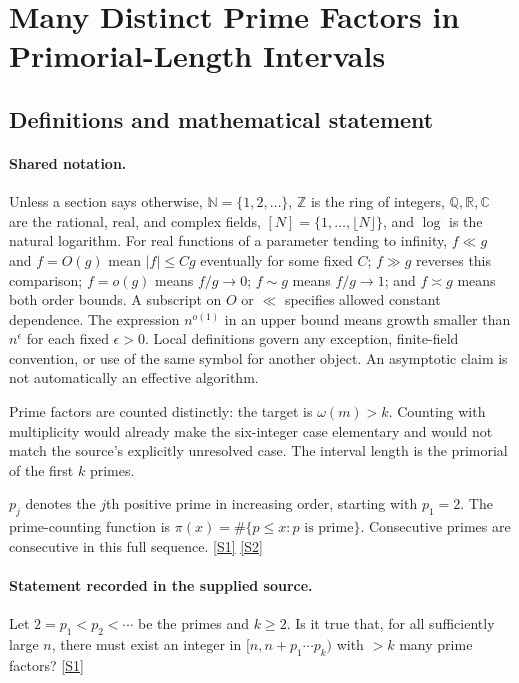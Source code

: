\documentclass[11pt,a4paper]{article}
\newcommand{\N}{\mathbb{N}}
\newcommand{\Z}{\mathbb{Z}}
\newcommand{\Q}{\mathbb{Q}}
\newcommand{\R}{\mathbb{R}}
\newcommand{\C}{\mathbb{C}}
\newcommand{\sref}[2]{\hyperlink{source:#1:#2}{[S#2]}}
\begin{document}
\section{Many Distinct Prime Factors in Primorial-Length Intervals}\label{statement}


\subsection{Definitions and mathematical statement}

\paragraph{Shared notation.}Unless a section says otherwise, $\N=\{1,2,\ldots\}$,
$\Z$ is the ring of integers, $\Q,\R,\C$ are the rational, real, and complex
fields, $[N]=\{1,\ldots,\lfloor N\rfloor\}$, and $\log$ is the natural
logarithm. For real functions of a parameter tending to infinity,
$f\ll g$ and $f=O(g)$ mean $|f|\leq Cg$ eventually for some fixed $C$;
$f\gg g$ reverses this comparison; $f=o(g)$ means $f/g\to0$;
$f\sim g$ means $f/g\to1$; and $f\asymp g$ means both order bounds.
A subscript on $O$ or $\ll$ specifies allowed constant dependence.
The expression $n^{o(1)}$ in an upper bound means growth smaller than
$n^\epsilon$ for each fixed $\epsilon>0$. Local definitions govern any
exception, finite-field convention, or use of the same symbol for another
object. An asymptotic claim is not automatically an effective algorithm.



Prime factors are counted distinctly: the target is $\omega(m)>k$. Counting with multiplicity would already make the six-integer case elementary and would not match the source's explicitly unresolved case. The interval length is the primorial of the first $k$ primes.

$p_j$ denotes the $j$th positive prime in increasing order, starting with $p_1=2$. The prime-counting function is $\pi(x)=\#\{p\leq x:p\text{ is prime}\}$. Consecutive primes are consecutive in this full sequence. \sref{statement}{1} \sref{statement}{2}

\paragraph{Statement recorded in the supplied source.}
Let $2=p_1<p_2<\cdots$ be the primes and $k\geq 2$. Is it true that, for all sufficiently large $n$, there must exist an integer in $[n,n+p_1\cdots p_k)$ with $>k$ many prime factors? \sref{statement}{1}
\end{document}
